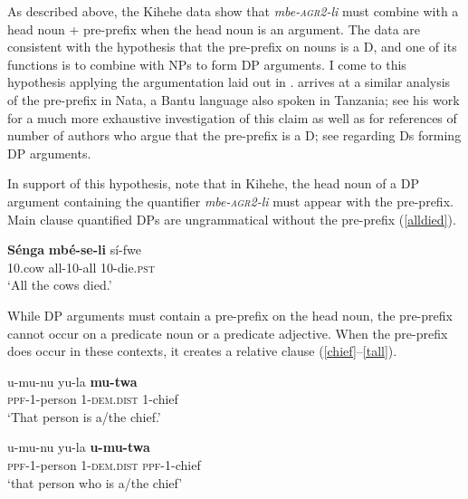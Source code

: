 \documentclass[letterpaper, 12pt]{article}
\begin{document}
As described above, the Kihehe data show that \textit{mbe-\textsc{agr2}-li} must combine with a head noun + pre-prefix when the head noun is an argument. The data are consistent with the hypothesis that the pre-prefix on nouns is a D, and one of its functions is to combine with NPs to form DP arguments. I come to this hypothesis applying the argumentation laid out in .  arrives at a similar analysis of the pre-prefix in Nata, a Bantu language also spoken in Tanzania; see his work for a much more exhaustive investigation of this claim as well as for references of number of authors who argue that the pre-prefix is a D; see  regarding Ds forming DP arguments.

In support of this hypothesis, note that in Kihehe, the head noun of a DP argument containing the quantifier \textit{mbe-\textsc{agr2}-li} must appear with the pre-prefix. Main clause quantified DPs are ungrammatical without the pre-prefix (\ref{alldied}).

\begin{exe}

\ex \label{alldied} \gll * \textbf{S\'enga} \textbf{mb\'e-se-li} s\'i-fwe \label{allcowsnoppf2}\\ 
{} 10.cow all-10-all 10-die.\textsc{pst} \\
`All the cows died.' 

\end{exe}

While DP arguments must contain a pre-prefix on the head noun, the pre-prefix cannot occur on a predicate noun or a predicate adjective. When the pre-prefix does occur in these contexts, it creates a relative clause (\ref{chief}--\ref{tall}). 

\begin{exe}
\ex \label{chief} \begin{xlist}

\ex \gll u-mu-nu yu-la \textbf{mu-twa} \\
\textsc{ppf}-1-person 1-\textsc{dem.dist} 1-chief \\
`That person is a/the chief.'


\ex \gll u-mu-nu yu-la \textbf{u-mu-twa} \\
\textsc{ppf}-1-person 1-\textsc{dem.dist} \textsc{ppf}-1-chief \\
`that person who is a/the chief'

\end{xlist}
\end{exe}
\end{document}
